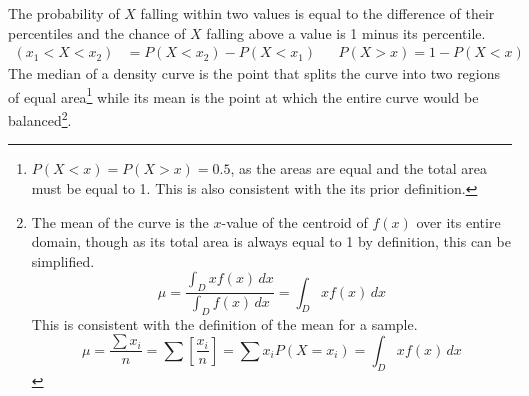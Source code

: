 \documentclass[../AP_Statistics.tex]{subfiles}
\begin{document}
			The probability of $X$ falling within two values is equal to the difference of their percentiles and the chance of $X$ falling above a value is 1 minus its percentile.
			\begin{align*}
				(x_1 < X < x_2) &= P(X < x_2) - P(X < x_1) && P(X > x) = 1 - P(X < x)
			\end{align*}
			The median of a density curve is the point that splits the curve into two regions of equal area\footnote{$P(X < x) = P(X > x) = 0.5$, as the areas are equal and the total area must be equal to 1. This is also consistent with the its prior definition.} while its mean is the point at which the entire curve would be balanced\footnote{The mean of the curve is the $x$-value of the centroid of $f(x)$ over its entire domain, though as its total area is always equal to 1 by definition, this can be simplified.\[\mu = \frac{\int_Dxf(x)\,dx}{\int_Df(x)\,dx} = \int_{D}xf(x)\,dx\]This is consistent with the definition of the mean for a sample.\[\mu = \frac{\sum x_i}{n} = \sum\left[\frac{x_i}{n}\right] = \sum x_iP(X = x_i) = \int_Dxf(x)\,dx\]}.
\end{document}
